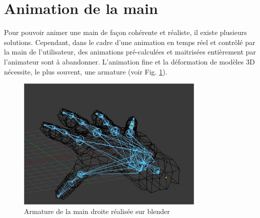 



\section{Animation de la main}
\label{animation}
Pour pouvoir animer une main de façon cohérente et réaliste, il existe plusieurs solutions.
Cependant, dans le cadre d'une animation en temps réel et contrôlé par la main de l'utilisateur, des animations pré-calculées et maitrisées entièrement par l'animateur sont à abandonner.
L'animation fine et la déformation de modèles 3D nécessite, le plus souvent, une armature (voir Fig. \ref{fig:armature}).\newline


\begin{figure}[!h]
	\centering
	\includegraphics[width=9cm]{images/SkellHand.jpg}
	\caption{Armature de la main droite réalisée sur blender}
	\label{fig:armature}
\end{figure}

